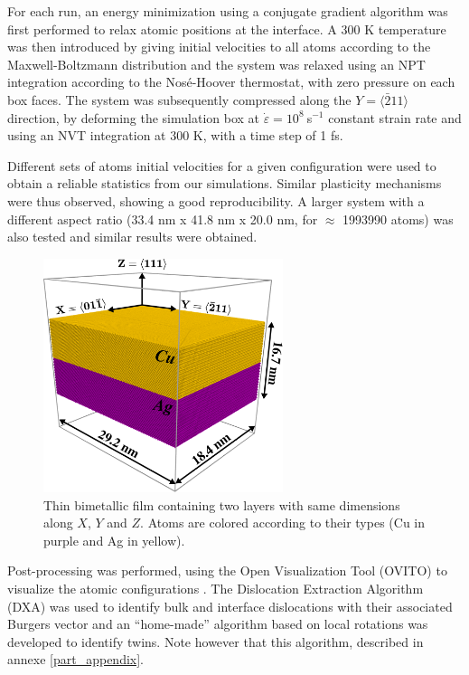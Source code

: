\documentclass[final,3p,times,twocolumn]{elsarticle}
\begin{document}
For each run, an energy minimization using a conjugate gradient algorithm was first performed to relax atomic positions at the interface. A 300 K temperature was then introduced by giving initial velocities to all atoms according to the Maxwell-Boltzmann distribution and the system was relaxed using an NPT integration according to the Nosé-Hoover thermostat, with zero pressure on each box faces. The system was subsequently compressed along the $Y=\langle\bar{2}11\rangle$ direction, by deforming the simulation box at $\dot{\varepsilon}=10^{8}~$s$^{-1}$ constant strain rate and using an NVT integration at 300 K, with a time step of 1 fs.

Different sets of atoms initial velocities for a given configuration were used to obtain a reliable statistics from our simulations. Similar plasticity mechanisms were thus observed, showing a good reproducibility. A larger system with a different aspect ratio (33.4 nm x 41.8 nm x 20.0 nm, for $\approx$ 1993990 atoms) was also tested and similar results were obtained. 

\begin{figure}[!h]
	\begin{center}
		\includegraphics[width=70mm]{Pic/mod_geo.eps} 
	\end{center}
	\caption{Thin bimetallic film containing two layers with same dimensions along $X$, $Y$ and $Z$. Atoms are colored according to their types (Cu in purple and Ag in yellow).}\label{fig_mod_geo}
\end{figure}

Post-processing was performed, using the Open Visualization Tool (OVITO) to visualize the atomic configurations \cite{stukowski10MSMSE1}. The Dislocation Extraction Algorithm (DXA) was used to identify bulk and interface dislocations with their associated Burgers vector and an ``home-made'' algorithm based on local rotations was developed to identify twins. Note however that this algorithm, described in annexe \ref{part_appendix}.
\end{document}
